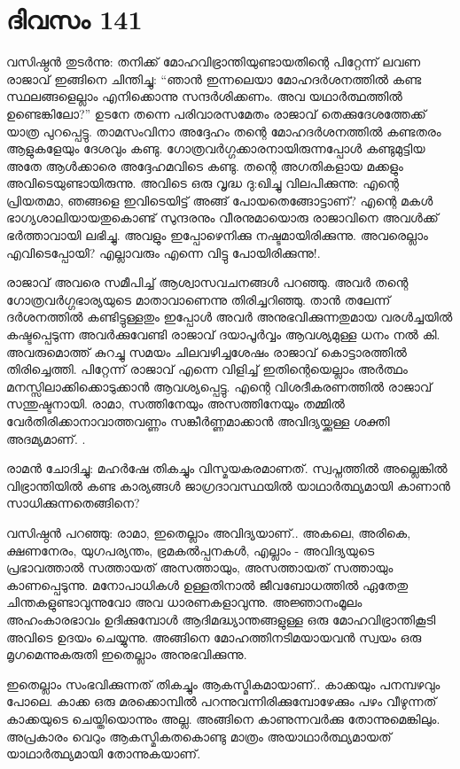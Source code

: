  
\section{ദിവസം 141}


വസിഷ്ഠൻ തുടർന്നു: തനിക്ക് മോഹവിഭ്രാന്തിയുണ്ടായതിന്റെ പിറ്റേന്ന് ലവണ രാജാവ് ഇങ്ങിനെ ചിന്തിച്ചു: “ഞാൻ ഇന്നലെയാ മോഹദർശനത്തിൽ കണ്ട സ്ഥലങ്ങളെല്ലാം എനിക്കൊന്നു സന്ദർശിക്കണം. അവ യഥാർത്ഥത്തിൽ ഉണ്ടെങ്കിലോ?” ഉടനേ തന്നെ പരിവാരസമേതം രാജാവ് തെക്കുദേശത്തേക്ക് യാത്ര പുറപ്പെട്ടു. താമസംവിനാ അദ്ദേഹം തന്റെ മോഹദർശനത്തിൽ കണ്ടതരം ആളുകളേയും ദേശവും കണ്ടു. ഗോത്രവർഗ്ഗക്കാരനായിരുന്നപ്പോൾ കണ്ടുമുട്ടിയ അതേ ആൾക്കാരെ അദ്ദേഹമവിടെ കണ്ടു. തന്റെ അഗതികളായ മക്കളും അവിടെയുണ്ടായിരുന്നു. അവിടെ ഒരു വൃദ്ധ ദു:ഖിച്ചു വിലപിക്കുന്നു: എന്റെ പ്രിയതമാ, ഞങ്ങളെ ഇവിടെയിട്ട് അങ്ങ് പോയതെങ്ങോട്ടാണ്‌? എന്റെ മകൾ ഭാഗ്യശാലിയായതുകൊണ്ട് സുന്ദരനും വീരനുമായൊരു രാജാവിനെ അവൾക്ക് ഭർത്താവായി ലഭിച്ചു. അവളും ഇപ്പോഴെനിക്കു നഷ്ടമായിരിക്കുന്നു. അവരെല്ലാം എവിടെപ്പോയി? എല്ലാവരും  എന്നെ വിട്ടു പോയിരിക്കുന്നു!.

രാജാവ് അവരെ സമീപിച്ച് ആശ്വാസവചനങ്ങൾ പറഞ്ഞു. അവർ തന്റെ ഗോത്രവർഗ്ഗഭാര്യയുടെ മാതാവാണെന്നു തിരിച്ചറിഞ്ഞു. താൻ തലേന്ന് ദർശനത്തിൽ കണ്ടിട്ടുള്ളതും ഇപ്പോൾ അവർ അനുഭവിക്കുന്നതുമായ വരൾച്ചയിൽ കഷ്ടപ്പെടുന്ന അവർക്കുവേണ്ടി രാജാവ് ദയാപൂർവ്വം ആവശ്യമുള്ള ധനം നൽ കി. അവരുമൊത്ത് കുറച്ചു സമയം ചിലവഴിച്ചശേഷം രാജാവ് കൊട്ടാരത്തിൽ തിരിച്ചെത്തി. പിറ്റേന്ന് രാജാവ് എന്നെ വിളിച്ച് ഇതിന്റെയെല്ലാം അർത്ഥം മനസ്സിലാക്കിക്കൊടുക്കാൻ ആവശ്യപ്പെട്ടു. എന്റെ വിശദീകരണത്തിൽ രാജാവ് സന്തുഷ്ടനായി. രാമാ, സത്തിനേയും അസത്തിനേയും തമ്മിൽ വേർതിരിക്കാനാവാത്തവണ്ണം സങ്കീർണ്ണമാക്കാൻ അവിദ്യയ്ക്കുള്ള ശക്തി അദമ്യമാണ്‌. .

രാമൻ ചോദിച്ചു: മഹർഷേ തികച്ചും വിസ്മയകരമാണത്. സ്വപ്നത്തിൽ അല്ലെങ്കിൽ വിഭ്രാന്തിയിൽ കണ്ട കാര്യങ്ങൾ ജാഗ്രദാവസ്ഥയിൽ യാഥാർത്ഥ്യമായി കാണാൻ സാധിക്കുന്നതെങ്ങിനെ?

വസിഷ്ഠൻ പറഞ്ഞു: രാമാ, ഇതെല്ലാം അവിദ്യയാണ്‌.. അകലെ, അരികെ, ക്ഷണനേരം, യുഗപര്യന്തം, ഭ്രമകൽപ്പനകൾ, എല്ലാം - അവിദ്യയുടെ പ്രഭാവത്താൽ സത്തായത് അസത്തായും, അസത്തായത് സത്തായും കാണപ്പെടുന്നു. മനോപാധികൾ ഉള്ളതിനാൽ ജീവബോധത്തിൽ ഏതേതു ചിന്തകളുണ്ടാവുന്നുവോ അവ ധാരണകളാവുന്നു. അജ്ഞാനംമൂലം അഹംകാരഭാവം ഉദിക്കുമ്പോൾ ആദിമദ്ധ്യാന്തങ്ങളുള്ള ഒരു മോഹവിഭ്രാന്തികൂടി അവിടെ ഉദയം ചെയ്യുന്നു. അങ്ങിനെ മോഹത്തിനടിമയായവൻ സ്വയം ഒരു മൃഗമെന്നുകരുതി ഇതെല്ലാം അനുഭവിക്കുന്നു.

ഇതെല്ലാം സംഭവിക്കുന്നത് തികച്ചും ആകസ്മികമായാണ്‌.. കാക്കയും പനമ്പഴവും പോലെ. കാക്ക ഒരു മരക്കൊമ്പിൽ പറന്നുവന്നിരിക്കുമ്പോഴേക്കും പഴം വീഴുന്നത് കാക്കയുടെ ചെയ്തിയൊന്നും അല്ല. അങ്ങിനെ കാണുന്നവർക്കു തോന്നുമെങ്കിലും. അപ്രകാരം വെറും ആകസ്മികതകൊണ്ടു മാത്രം അയാഥാർത്ഥ്യമായത് യാഥാർത്ഥ്യമായി തോന്നുകയാണ്‌.


